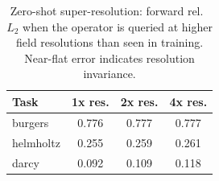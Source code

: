 \begin{table}[t]
\centering
\caption{Zero-shot super-resolution: forward rel.\ $L_2$ when the operator is queried at higher field resolutions than seen in training. Near-flat error indicates resolution invariance.}
\label{tab:scaling}
\begin{tabular}{lccc}
\toprule
Task & 1x res. & 2x res. & 4x res. \\
\midrule
burgers & 0.776 & 0.777 & 0.777 \\
helmholtz & 0.255 & 0.259 & 0.261 \\
darcy & 0.092 & 0.109 & 0.118 \\
\bottomrule
\end{tabular}
\end{table}
